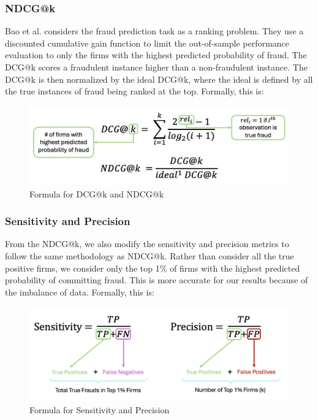 \documentclass[conference]{IEEEtran}
\begin{document}
	\subsubsection{NDCG@k} Bao et al. considers the fraud prediction task as a ranking problem. They use a discounted cumulative gain function to limit the out-of-sample performance evaluation to only the firms with the highest predicted probability of fraud. The DCG@k scores a fraudulent instance higher than a non-fraudulent instance. The DCG@k is then normalized by the ideal DCG@k, where the ideal is defined by all the true instances of fraud being ranked at the top. Formally, this is: \vspace{10pt}\begin{figure}[H]
	\centerline{\includegraphics[width=\columnwidth]{ndcg}}
	\caption{Formula for DCG@k and NDCG@k}
	\label{fig}
	\end{figure} 
	\subsubsection{Sensitivity and Precision} From the NDCG@k, we also modify the sensitivity and precision metrics to follow the same methodology as NDCG@k. Rather than consider all the true positive firms, we consider only the top 1\% of firms with the highest predicted probability of committing fraud. This is more accurate for our results because of the imbalance of data. Formally, this is: \vspace{10pt}\begin{figure}[H]
	\centerline{\includegraphics[width=\columnwidth]{sensprec}}
	\caption{Formula for Sensitivity and Precision}
	\label{fig}
	\end{figure} 
\end{document}
